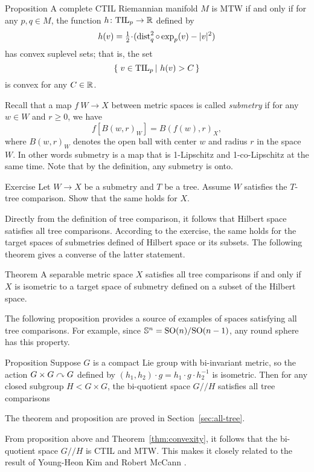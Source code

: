 \begin{thm}{Proposition}\label{prop:convexity}
A complete CTIL Riemannian manifold $M$ is MTW if and only if 
for any $p,q\in M$, the function $h\colon \mathrm{\rm TIL}_p\to \mathbb{R}$ defined by
\[h(v)=\tfrac12\cdot(\dist_q^2\circ\exp_p(v)-|v|^2)\] 
has convex suplevel sets; that is, the set
\[\set{v\in\TIL_p}{h(v)> C}\]
is convex for any $C\in\mathbb{R}$.
\end{thm}


Recall that a map $f\:W\to X$ between metric spaces is called \emph{submetry} if for any $w\in W$ and $r\ge 0$, we have 
\[f[B(w,r)_W]=B(f(w),r)_X,\]
where $B(w,r)_W$ denotes the open ball with center $w$ and radius $r$ in the space $W$.
In other words submetry is a map that is 1-Lipschitz and 1-co-Lipschitz at the same time.
Note that by the definition, any submetry is onto.

\begin{thm}{Exercise}
Let $W\to X$ be a submetry and $T$ be a tree.
Assume $W$ satisfies the $T$-tree comparison.
Show that the same holds for $X$.
\end{thm}

Directly from the definition of tree comparison, it follows that Hilbert space satisfies all tree comparisons.
According to the exercise, the same holds for the target spaces of submetries defined of Hilbert space or its subsets.
The following theorem gives a converse of the latter statement.


\begin{thm}{Theorem}\label{thm:hilbert-quotient}
A separable metric space $X$ satisfies all tree comparisons if and only if
$X$ is isometric to a target space of submetry defined on a subset  of the Hilbert space.
\end{thm} %

The following proposition provides a source of examples of spaces satisfying all tree comparisons.
For example, since $\mathbb{S}^n=\mathrm{SO}(n)/\mathrm{SO}(n-1)$, any round sphere has this property.


\begin{thm}{Proposition}\label{prop:group}
Suppose $G$ is a compact Lie group with bi-invariant metric, so the action $G\times G\curvearrowright G$ defined by $(h_1,h_2)\cdot g=h_1\cdot g\cdot  h_2^{-1}$ is isometric. 
Then for any closed subgroup $H<G\times G$, the bi-quotient space $G/\!\!/H$ satisfies all tree comparisons
\end{thm}

The theorem and proposition are proved in Section~\ref{sec:all-tree}.

From proposition above and Theorem~\ref{thm:convexity}, it follows that the bi-quotient space $G/\!\!/H$ is CTIL and MTW.
This makes it closely related to the result of Young-Heon Kim and Robert McCann \cite{kim-mccann}.

